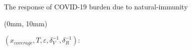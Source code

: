\begin{frame}{The response of COVID-19 burden due to natural-immunity}
    \begin{textblock*}{127mm}(0mm, 10mm) 
        \begin{block}{%
            $
                (x_{coverage},
                T, \varepsilon,\delta_{V}^{-1}, \delta_{R}^{-1}):
            $%
        }
        \end{block}
    \end{textblock*}
\end{frame}